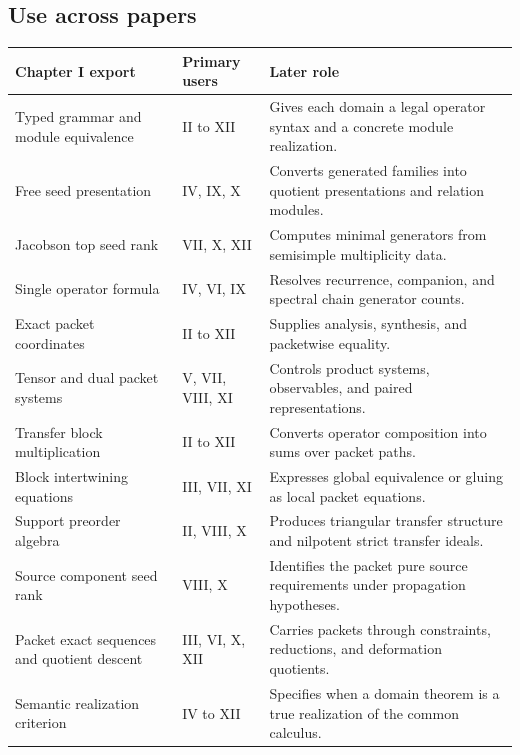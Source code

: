 \subsection{Use across papers}
\begin{center}
\begin{longtable}{@{}>{\raggedright\arraybackslash}p{}>{\raggedright\arraybackslash}p{}>{\raggedright\arraybackslash}p{}@{}}
\toprule
\textbf{Chapter I export} & \textbf{Primary users} & \textbf{Later role}\\
\midrule
\endhead
Typed grammar and module equivalence & II to XII & Gives each domain a legal operator syntax and a concrete module realization.\\
Free seed presentation & IV, IX, X & Converts generated families into quotient presentations and relation modules.\\
Jacobson top seed rank & VII, X, XII & Computes minimal generators from semisimple multiplicity data.\\
Single operator formula & IV, VI, IX & Resolves recurrence, companion, and spectral chain generator counts.\\
Exact packet coordinates & II to XII & Supplies analysis, synthesis, and packetwise equality.\\
Tensor and dual packet systems & V, VII, VIII, XI & Controls product systems, observables, and paired representations.\\
Transfer block multiplication & II to XII & Converts operator composition into sums over packet paths.\\
Block intertwining equations & III, VII, XI & Expresses global equivalence or gluing as local packet equations.\\
Support preorder algebra & II, VIII, X & Produces triangular transfer structure and nilpotent strict transfer ideals.\\
Source component seed rank & VIII, X & Identifies the packet pure source requirements under propagation hypotheses.\\
Packet exact sequences and quotient descent & III, VI, X, XII & Carries packets through constraints, reductions, and deformation quotients.\\
Semantic realization criterion & IV to XII & Specifies when a domain theorem is a true realization of the common calculus.\\
\bottomrule
\end{longtable}
\end{center}


